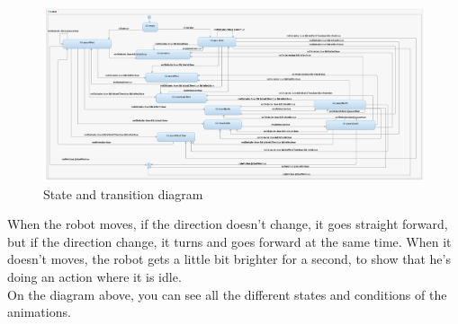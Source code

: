 \documentclass[a4paper, 10pt, oneside]{article}
\begin{document}
	\begin{figure}[h]
		\centering
		\includegraphics[scale=0.28]{img/state_transition.png}
		\caption{State and transition diagram}
		\label{fig:StateTransition}
	\end{figure}
	
	When the robot moves, if the direction doesn't change, it goes straight forward, but if the direction change, it turns and goes forward at the same time.
	When it doesn't moves, the robot gets a little bit brighter for a second, to show that he's doing an action where it is idle.\\
	On the diagram above, you can see all the different states and conditions of the animations.

\newpage
\end{document}
